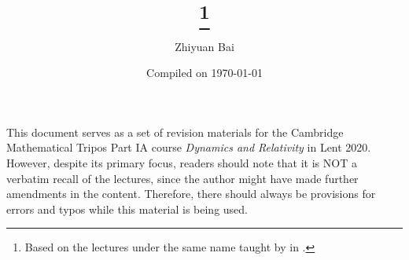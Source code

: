 \documentclass[a4paper]{article}
\title{\triposcourse{}
\thanks{Based on the lectures under the same name taught by \triposlecturer{} in \triposterm{}.}}
\author{Zhiyuan Bai}
\date{Compiled on \today}
\newcommand{\triposcourse}{Dynamics and Relativity}
\newcommand{\triposterm}{Lent 2020}
\newcommand{\tripospart}{IA}
\theoremstyle{plain}
\theoremstyle{definition}
\theoremstyle{remark}
\begin{document}
    \maketitle
    This document serves as a set of revision materials for the Cambridge Mathematical Tripos Part \tripospart{} course \textit{\triposcourse{}} in \triposterm{}.
    However, despite its primary focus, readers should note that it is NOT a verbatim recall of the lectures, since the author might have made further amendments in the content.
    Therefore, there should always be provisions for errors and typos while this material is being used.
    \tableofcontents
    
    
    
    
    
    
    
    
\end{document}
